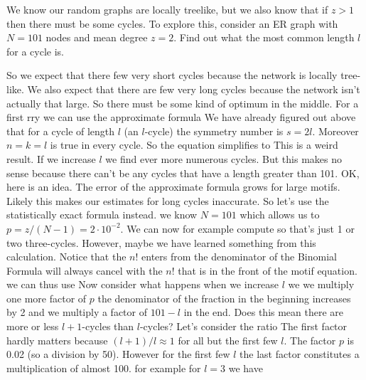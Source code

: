 We know our random graphs are locally treelike, but we also know that if $z>1$ then there must be some cycles. To explore this, consider an ER graph with $N=101$ nodes and mean degree $z=2$. Find out what the most common length $l$ for a cycle is. 

\solution 
So we expect that there few very short cycles because the network is locally tree-like. We also expect that there are few very long cycles because the network isn't actually that large. So there must be some kind of optimum in the middle. For a first rry we can use the approximate formula 
We have already figured out above that for a cycle of length $l$ (an $l$-cycle) the symmetry number is $s=2l$. Moreover $n=k=l$ is true in every cycle. So the equation simplifies to 
This is a weird result. If we increase $l$ we find ever more numerous cycles. But this makes no sense because there can't be any cycles that have a length greater than 101. OK, here is an idea. The error of the approximate formula grows for large motifs. Likely this makes our estimates for long cycles inaccurate. So let's use the statistically exact formula instead.  
we know $N=101$ which allows us to $p=z/(N-1)=2\cdot 10^{-2}$. We can now for example compute 
so that's just 1 or two three-cycles. However, maybe we have learned something from this calculation. Notice that the $n!$ enters from the denominator of the Binomial Formula will always cancel with the $n!$ that is in the front of the motif equation. we can thus use
Now consider what happens when we increase $l$ we we multiply one more factor of $p$ the denominator of the fraction in the beginning increases by 2 and we multiply a factor of $101-l$ in the end. Does this mean there are more or less $l+1$-cycles than $l$-cycles? Let's consider the ratio 
The first factor hardly matters because $(l+1)/l\approx 1$ for all but the first few $l$. The factor $p$ is 0.02 (so a division by 50). However for the first few $l$ the last factor constitutes a multiplication of almost 100. for example for $l=3$ we have 
